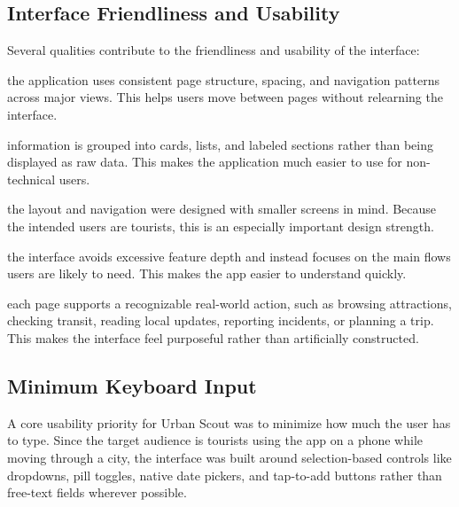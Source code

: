 \subsection{Interface Friendliness and Usability}

Several qualities contribute to the friendliness and usability of the interface:

 the application uses consistent page structure, spacing, and navigation patterns across major views. This helps users move between pages without relearning the interface.

 information is grouped into cards, lists, and labeled sections rather than being displayed as raw data. This makes the application much easier to use for non-technical users.

 the layout and navigation were designed with smaller screens in mind. Because the intended users are tourists, this is an especially important design strength.

 the interface avoids excessive feature depth and instead focuses on the main flows users are likely to need. This makes the app easier to understand quickly.

 each page supports a recognizable real-world action, such as browsing attractions, checking transit, reading local updates, reporting incidents, or planning a trip. This makes the interface feel purposeful rather than artificially constructed.

\subsection{Minimum Keyboard Input}

A core usability priority for Urban Scout was to minimize how much the user has to type. Since the target audience is tourists using the app on a phone while moving through a city, the interface was built around selection-based controls like dropdowns, pill toggles, native date pickers, and tap-to-add buttons rather than free-text fields wherever possible.

